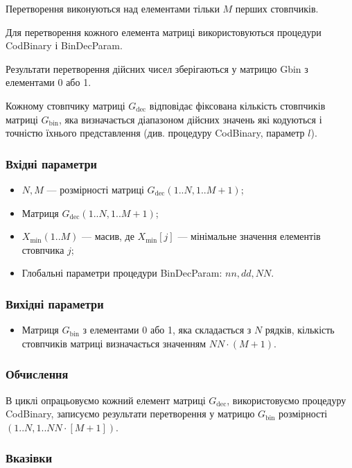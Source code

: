 \documentclass[a4paper, 12pt]{article}
\numberwithin{equation}{section}
\begin{document}
Перетворення виконуються над елементами тільки $M$ перших стовпчиків. \medskip

Для перетворення кожного елемента матриці використовуються процедури CodBinary і BinDecParam. \medskip

Результати перетворення дійсних чисел зберігаються у матрицю Gbin з елементами 0 або 1. \medskip

Кожному стовпчику матриці $G_{\text{dec}}$ відповідає фіксована кількість стовпчиків матриці $G_{\text{bin}}$, яка визначається діапазоном дійсних значень які кодуються і точністю їхнього представлення (див. процедуру CodBinary, параметр $l$).

\subsubsection*{Вхідні параметри}

\begin{itemize}
    \item $N, M$ --- розмірності матриці $G_{\text{dec}}(1..N,1..M+1)$;
    \item Матриця $G_{\text{dec}}(1..N,1..M+1)$;
    \item $X_{\text{min}}(1..M)$ --- масив, де $X_{\text{min}}[j]$ --- мінімальне значення елементів стовпчика $j$;
    \item Глобальні параметри процедури BinDecParam: $nn, dd, NN$.
\end{itemize}

\subsubsection*{Вихідні параметри}

\begin{itemize}
    \item Матриця $G_{\text{bin}}$ з елементами 0 або 1, яка складається з $N$ рядків, кількість стовпчиків матриці визначається значенням $NN \cdot (M + 1)$.
\end{itemize}

\subsubsection*{Обчислення}

В циклі опрацьовуємо кожний елемент матриці $G_{\text{dec}}$, використовуємо процедуру CodBinary, записуємо результати перетворення у матрицю $G_{\text{bin}}$ розмірності $(1..N, 1..NN \cdot [M+1])$.

\subsubsection*{Вказівки}
\end{document}
